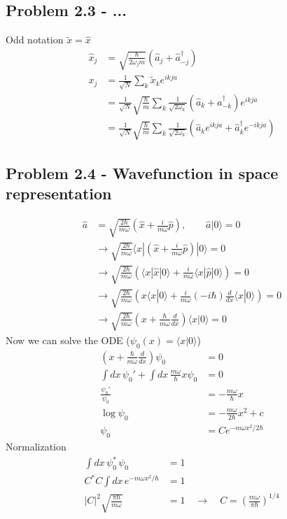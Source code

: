 \documentclass[10pt,a4paper]{book}
\theoremstyle{definition}
\begin{document}
\subsection{Problem 2.3 - ...}
Odd notation $\tilde{x}=\hat{x}$
\begin{align}
\hat{x}_j&=\sqrt{\frac{\hbar}{2\omega_j m}}(\hat{a}_j+\hat{a}_{-j}^\dagger)\\
x_j
&=\frac{1}{\sqrt{N}}\sum_k\tilde{x}_ke^{ikja}\\
&=\frac{1}{\sqrt{N}}\sqrt{\frac{\hbar}{m}}\sum_k\frac{1}{\sqrt{2\omega_k}}(\hat{a}_k+\hat{a}_{-k}^\dagger)e^{ikja}\\
&=\frac{1}{\sqrt{N}}\sqrt{\frac{\hbar}{m}}\sum_k\frac{1}{\sqrt{2\omega_k}}(\hat{a}_k e^{ikja}+\hat{a}_{k}^\dagger e^{-ikja})
\end{align}


\subsection{Problem 2.4 - Wavefunction in space representation}
\begin{align}
\hat{a}&=\sqrt{\frac{2\hbar}{m\omega}}\left(\hat{x}+\frac{i}{m\omega}\hat{p}\right), \qquad \hat{a}|0\rangle=0\\
&\rightarrow\sqrt{\frac{2\hbar}{m\omega}}\langle x|\left(\hat{x}+\frac{i}{m\omega}\hat{p}\right)|0\rangle=0\\
&\rightarrow\sqrt{\frac{2\hbar}{m\omega}}\left(\langle x|\hat{x}|0\rangle+\frac{i}{m\omega}\langle x|\hat{p}|0\rangle\right)=0\\
&\rightarrow\sqrt{\frac{2\hbar}{m\omega}}\left(x\langle x|0\rangle+\frac{i}{m\omega}(-i\hbar)\frac{d}{dx}\langle x|0\rangle\right)=0\\
&\rightarrow\sqrt{\frac{2\hbar}{m\omega}}\left(x+\frac{\hbar}{m\omega}\frac{d}{dx}\right)\langle x|0\rangle=0
\end{align}
Now we can solve the ODE ($\psi_0(x)=\langle x|0\rangle$)
\begin{align}
\left(x+\frac{\hbar}{m\omega}\frac{d}{dx}\right)\psi_0&=0\\
\int dx\,\psi_0'+\int dx\,\frac{m\omega}{\hbar} x\psi_0&=0\\
\frac{\psi_0'}{\psi_0}&=-\frac{m\omega}{\hbar}x\\
\log\psi_0&=-\frac{m\omega}{2\hbar}x^2+c\\
\psi_0&=Ce^{-m\omega x^2/2\hbar}
\end{align}
Normalization
\begin{align}
\int dx\,\psi_0^*\,\psi_0&=1\\
C^*C\int dx\,e^{-m\omega x^2/\hbar}&=1\\
|C|^2\sqrt{\frac{\pi\hbar}{m\omega}}&=1\quad\rightarrow\quad C=\left(\frac{m\omega}{\pi\hbar}\right)^{1/4}
\end{align}
\end{document}
